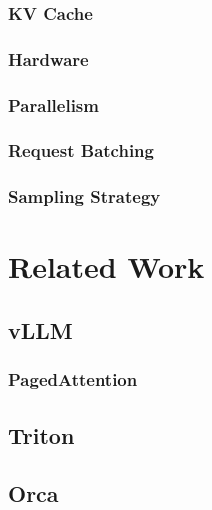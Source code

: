 \documentclass[12pt,twoside]{report}
\begin{document}
\subsubsection{KV Cache}\label{subsubsection:kvcache}

\subsubsection{Hardware}

\subsubsection{Parallelism}
\begin{comment}
(sources)
https://docs.vllm.ai/en/latest/serving/distributed_serving.html
https://colossalai.org/docs/concepts/paradigms_of_parallelism/


data parallel
- copy model to different gpus
	- can be used to train on multiple batches in parallel

tensor parallel 
- split the tensors for a single layer across gpus

pipeline parallel
- split whole layers across gpus
\end{comment}

\subsubsection{Request Batching}
\subsubsection{Sampling Strategy}\label{subsubsection:samplingstrategy}

\section{Related Work}\label{section:relatedwork}
\subsection{vLLM}
\subsubsection{PagedAttention}
\subsection{Triton}
\subsection{Orca}
\end{document}
